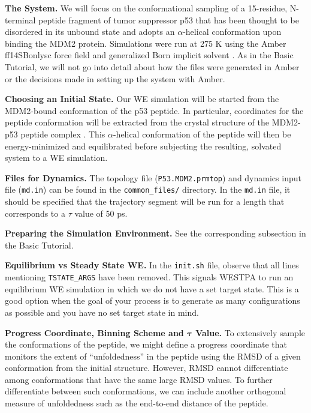 \documentclass[9pt,tutorial,pubversion]{livecoms}
\begin{document}
\textbf{The System.} We will focus on  the conformational sampling of a 15-residue, N-terminal peptide fragment of tumor suppressor p53 that has been thought to be disordered in its unbound state and adopts an $\alpha$-helical conformation upon binding the MDM2 protein. 
Simulations were run at 275 K using the Amber ff14SBonlysc force field \citep{ff} and generalized Born implicit solvent \citep{implicit_solvent}. 
As in the Basic Tutorial, we will not go into detail about how the files were generated in Amber or the decisions made in setting up the system with Amber.

\textbf{Choosing an Initial State.} Our WE simulation will be started from the MDM2-bound conformation of the p53 peptide. 
In particular, coordinates for the peptide conformation will be extracted from the crystal structure of the MDM2-p53 peptide complex \citep{Kussie1996}. 
This $\alpha$-helical conformation of the peptide will then be energy-minimized and equilibrated before subjecting the resulting, solvated system to a WE simulation.

\textbf{Files for Dynamics.} The topology file (\verb|P53.MDM2.prmtop|) and dynamics input file (\verb|md.in|) can be found in the \verb|common_files/| directory. 
In the \verb|md.in| file, it should be specified that the trajectory segment will be run for a length that corresponds to a $\tau$ value of 50 ps.

\textbf{Preparing the Simulation Environment.} See the corresponding subsection in the Basic Tutorial.

\textbf{Equilibrium vs Steady State WE.} In the \verb|init.sh| file, observe that all lines mentioning \verb|TSTATE_ARGS| have been removed. 
This signals WESTPA to run an equilibrium WE simulation in which we do not have a set target state. 
This is a good option when the goal of your process is to generate as many configurations as possible and you have no set target state in mind.

\textbf{Progress Coordinate, Binning Scheme and $\pmb{\tau}$ Value.} To extensively sample the conformations of the peptide, we might define a progress coordinate that monitors the extent of “unfoldedness” in the peptide using the RMSD of a given conformation from the initial structure. 
However, RMSD cannot differentiate among conformations that have the same large RMSD values. 
To further differentiate between such conformations, we can include another orthogonal measure of unfoldedness such as the end-to-end distance of the peptide. 
\end{document}
